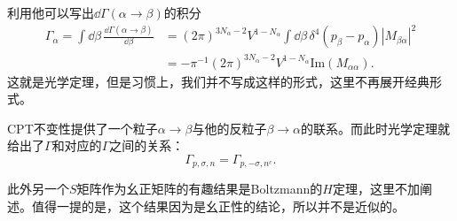 \documentclass[9pt]{extbook}
\begin{document}
利用他可以写出$\dd \Gamma(\alpha\to\beta)$的积分
\[
	\begin{split}
	\Gamma_\alpha=\int \dd\beta\, \frac{\dd \Gamma(\alpha\to\beta)}{\dd\beta}&=(2\pi)^{3N_\alpha-2}V^{1-N_\alpha}\int\dd\beta \,\delta^4(p_\beta-p_\alpha) |M_{\beta\alpha}|^2\\
	&=-\pi^{-1}(2\pi)^{3N_\alpha-2}V^{1-N_\alpha}\mathrm{Im}(M_{\alpha\alpha}).
	\end{split}
\]
这就是光学定理，但是习惯上，我们并不写成这样的形式，这里不再展开经典形式。

CPT不变性提供了一个粒子$\alpha\to\beta$与他的反粒子$\beta\to\alpha$的联系。而此时光学定理就给出了$\Gamma$和对应的$\Gamma$之间的关系：
\[
	\Gamma_{p,\sigma,n}=\Gamma_{p,-\sigma,n^c}.
\]

此外另一个$S$矩阵作为幺正矩阵的有趣结果是Boltzmann的$H$定理，这里不加阐述。值得一提的是，这个结果因为是幺正性的结论，所以并不是近似的。
\end{document}
